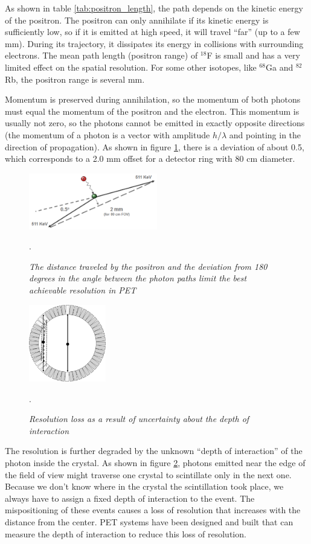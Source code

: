 \documentclass[11pt,oneside]{book}
\begin{document}
As shown in table \ref{tab:positron_length}, the path depends on the
kinetic energy of the positron. The positron can only annihilate if
its kinetic energy is sufficiently low, so if it is emitted at high
speed, it will travel ``far'' (up to a few mm). During its trajectory,
it dissipates its energy in collisions with surrounding electrons. The
mean path length (positron range) of $^{18}$F is small and has a very
limited effect on the spatial resolution. For some other isotopes,
like $^{68}$Ga and $^{82}$Rb, the positron range is several mm.

Momentum is preserved during annihilation, so the momentum of both photons
must equal the momentum of the positron and the electron. This momentum is
usually not zero, so the photons cannot be emitted in exactly opposite
directions (the momentum of a photon is a vector with amplitude $h/\lambda$
and pointing in the direction of propagation). As shown in figure
\ref{fig:positron_error}, there is a deviation of about 0.5\textdegree, which
corresponds to a 2.0 mm offset for a detector ring with 80 cm diameter.
%
\begin{figure}[tb]
\centering
\includegraphics[width=0.5\textwidth]{figs/fig_positron_error.pdf}
\caption{\label{fig:positron_error} \emph{The distance traveled by the
positron and the deviation from 180 degrees in the angle between the photon
paths limit the best achievable resolution in PET}}.
\end{figure}


\begin{figure}[tb]
\centering
\includegraphics[width=0.3\textwidth]{figs/fig_doi.pdf}
\caption{\label{fig:doi} \emph{Resolution loss as a result of
    uncertainty about the depth of interaction}}.
\end{figure}
%
The resolution is further degraded by the unknown ``depth of
interaction'' of the photon inside the crystal. As shown in figure
\ref{fig:doi}, photons emitted near the edge of the field of view
might traverse one crystal to scintillate only in the next
one. Because we don't know where in the crystal the scintillation took
place, we always have to assign a fixed depth of interaction to the
event. The mispositioning of these events causes a loss of resolution
that increases with the distance from the center. PET systems have
been designed and built that can measure the depth of interaction to
reduce this loss of resolution.
\end{document}
